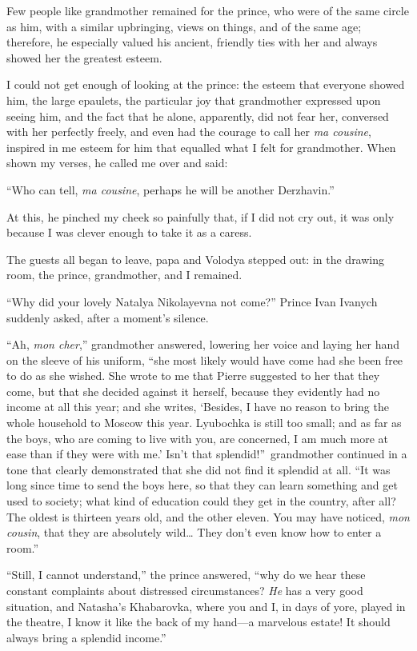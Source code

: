 Few people like grandmother remained for the prince, who were of the same circle as him, with a similar upbringing, views on things, and of the same age; therefore, he especially valued his ancient, friendly ties with her and always showed her the greatest esteem.

I could not get enough of looking at the prince: the esteem that everyone showed him, the large epaulets, the particular joy that grandmother expressed upon seeing him, and the fact that he alone, apparently, did not fear her, conversed with her perfectly freely, and even had the courage to call her \textit{ma cousine}, inspired in me esteem for him that equalled what I felt for grandmother. When shown my verses, he called me over and said:

``Who can tell, \textit{ma cousine}, perhaps he will be another Derzhavin.'' %

At this, he pinched my cheek so painfully that, if I did not cry out, it was only because I was clever enough to take it as a caress.

The guests all began to leave, papa and Volodya stepped out: in the drawing room, the prince, grandmother, and I remained.

``Why did your lovely Natalya Nikolayevna not come?'' Prince Ivan Ivanych suddenly asked, after a moment's silence. %

``Ah, \textit{mon cher},'' grandmother answered, lowering her voice and laying her hand on the sleeve of his uniform, ``she most likely would have come had she been free to do as she wished. She wrote to me that Pierre suggested to her that they come, but that she decided against it herself, because they evidently had no income at all this year; and she writes, `Besides, I have no reason to bring the whole household to Moscow this year. Lyubochka is still too small; and as far as the boys, who are coming to live with you, are concerned, I am much more at ease than if they were with me.' Isn't that splendid!''~grandmother continued in a tone that clearly demonstrated that she did not find it splendid at all. ``It was long since time to send the boys here, so that they can learn something and get used to society; what kind of education could they get in the country, after all? The oldest is thirteen years old, and the other eleven. You may have noticed, \textit{mon cousin}, that they are absolutely wild\ldots{} They don't even know how to enter a room.'' %

``Still, I cannot understand,'' the prince answered, ``why do we hear these constant complaints about distressed circumstances? \emph{He} has a very good situation, and Natasha's Khabarovka, where you and I, in days of yore, played in the theatre, I know it like the back of my hand---a marvelous estate! It should always bring a splendid income.'' %

